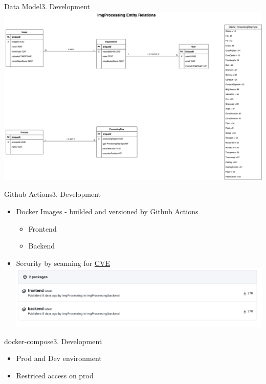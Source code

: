 \documentclass[aspectratio=169,20pt]{beamer}
\begin{document}
\begin{frame}{Data Model}{3. Development}
	\includegraphics[scale=0.40]{db_model}	
\end{frame}

\begin{frame}{Github Actions}{3. Development}
	\begin{itemize}
		\item{Docker Images - builded and versioned by Github Actions}
		\begin{itemize}
			\item{Frontend}
			\item{Backend}
		\end{itemize}
        \item{Security by scanning for \href{https://github.com/marketplace/actions/container-image-scan/}{CVE}}
		\includegraphics[scale=0.8]{action}
	\end{itemize}
\end{frame}

\begin{frame}{docker-compose}{3. Development}
	\begin{itemize}
		\item{Prod and Dev environment}
		\item{Restriced access on prod}
	\end{itemize}
\end{frame}
\end{document}
